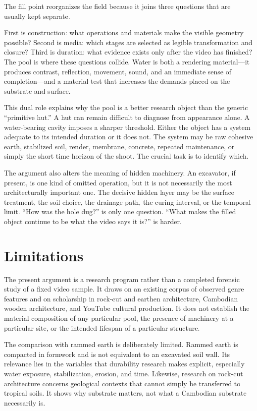 \documentclass[11pt]{article}
\begin{document}
The fill point reorganizes the field because it joins three questions that are usually kept separate.

First is construction: what operations and materials make the visible geometry possible? Second is media: which stages are selected as legible transformation and closure? Third is duration: what evidence exists only after the video has finished? The pool is where these questions collide. Water is both a rendering material---it produces contrast, reflection, movement, sound, and an immediate sense of completion---and a material test that increases the demands placed on the substrate and surface.

This dual role explains why the pool is a better research object than the generic ``primitive hut.'' A hut can remain difficult to diagnose from appearance alone. A water-bearing cavity imposes a sharper threshold. Either the object has a system adequate to its intended duration or it does not. The system may be raw cohesive earth, stabilized soil, render, membrane, concrete, repeated maintenance, or simply the short time horizon of the shoot. The crucial task is to identify which.

The argument also alters the meaning of hidden machinery. An excavator, if present, is one kind of omitted operation, but it is not necessarily the most architecturally important one. The decisive hidden layer may be the surface treatment, the soil choice, the drainage path, the curing interval, or the temporal limit. ``How was the hole dug?'' is only one question. ``What makes the filled object continue to be what the video says it is?'' is harder.

\section{Limitations}

The present argument is a research program rather than a completed forensic study of a fixed video sample. It draws on an existing corpus of observed genre features and on scholarship in rock-cut and earthen architecture, Cambodian wooden architecture, and YouTube cultural production. It does not establish the material composition of any particular pool, the presence of machinery at a particular site, or the intended lifespan of a particular structure.

The comparison with rammed earth is deliberately limited. Rammed earth is compacted in formwork and is not equivalent to an excavated soil wall. Its relevance lies in the variables that durability research makes explicit, especially water exposure, stabilization, erosion, and time. Likewise, research on rock-cut architecture concerns geological contexts that cannot simply be transferred to tropical soils. It shows why substrate matters, not what a Cambodian substrate necessarily is.
\end{document}
